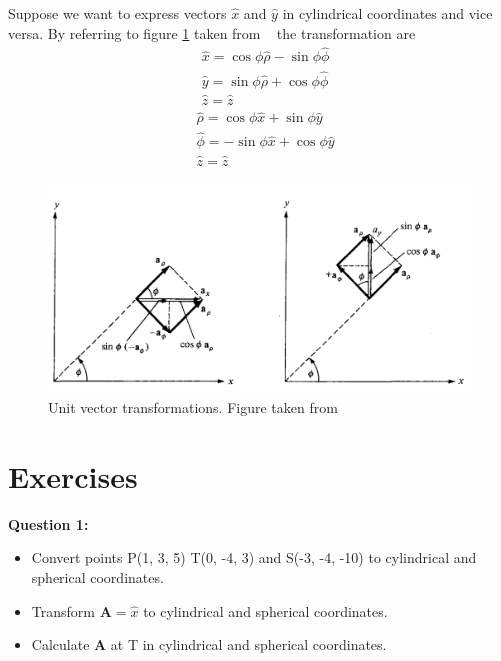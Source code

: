 \documentclass[12pt,a4paper]{article}
\begin{document}
Suppose we want to express vectors $\hat x$ and $\hat y$ in cylindrical coordinates and vice versa. By referring to figure \ref{Cylindrical-Spherical-transformation} taken from ~\cite[Figure 2.3, page 31]{Sadiku} the transformation are
\begin{equation}
\begin{split}
&\hat x=\cos\phi\hat \rho-\sin\phi \hat \phi\\
&\hat y=\sin\phi\hat \rho+\cos\phi \hat \phi\\
&\hat z=\hat z
\end{split}
\end{equation}
\begin{equation}
\begin{split}
&\hat \rho=\cos\phi\hat x+\sin\phi \hat y\\
&\hat \phi=-\sin\phi\hat x+\cos\phi \hat y\\
&\hat z=\hat z
\end{split}
\end{equation}
\begin{figure}[H]
\centering
\includegraphics[scale=0.4]{Figure2-3S.png}
\caption{Unit vector transformations. Figure taken from~\cite[Figure 2.3, page 31]{Sadiku}}
\label{Cylindrical-Spherical-transformation}
\end{figure}
\section{Exercises}
\noindent\textbf{Question 1:}
\begin{itemize}
\item[(1)] Convert points P(1, 3, 5) T(0, -4, 3) and S(-3, -4, -10) to cylindrical and spherical coordinates.
\item[(2)] Transform \textbf{A}$=\hat x$ to cylindrical and spherical coordinates.
\item[(3)] Calculate \textbf{A} at T in cylindrical and spherical coordinates.
\end{itemize}


\end{document}

